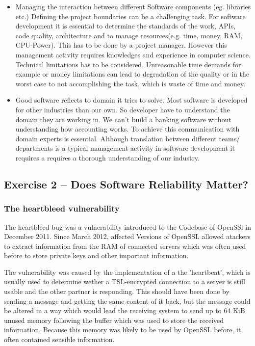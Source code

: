 \documentclass{scrartcl}
\begin{document}
\begin{itemize}
\item Managing the interaction between different Software components (eg. libraries etc.)
Defining the project boundaries can be a challenging task.
For software development it is essential to determine the standards of the work,
APIs, code quality, architecture and to manage resources(e.g. time, money, RAM, CPU-Power).
This has to be done by a project manager. However this management activity requires knowledges
and experience in computer science. Technical limitations has to be considered.
Unreasonable time demands for example or money limitations can lead to degradation of the quality
or in the worst case to not accomplishing the task, which is waste of time and money.

\item Good software reflects to domain it tries to solve.
Most software is developed for other industries than our own. So developer have to understand the domain they are working in. We can't build a banking software without understanding how accounting works.
To achieve this communication with domain experts is essential.
Although translation between different teams/ departments is a typical management activity in software development it requires a requires a thorough understanding of our industry.
\end{itemize}

\subsection*{Exercise 2 – Does Software Reliability Matter?}

\subsubsection*{The heartbleed vulnerability}

The heartbleed bug was a vulnerability introduced to the Codebase of OpenSSl in December 2011. Since March 2012, affected Versions of OpenSSL allowed atackers to extract information from the RAM of connected servers which was often used before to store private keys and other important information.

The vulnerability was caused by the implementation of a the 'heartbeat', which is usually used to determine wether a TSL-encrypted connection to a server is still usable and the other partner is responding. This should have been done by sending a message and getting the same content of it back, but the message could be altered in a way which would lead the receiving system to send up to 64 KiB unused memory following the buffer which was used to store the received information. Because this memory was likely to be used by OpenSSL before, it often contained sensible information.\\
\end{document}
